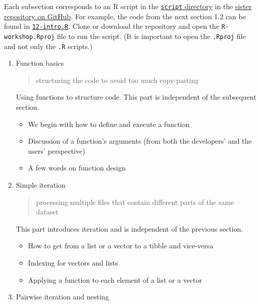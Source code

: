 \documentclass[]{book}
\providecommand{\tightlist}{%
  \setlength{\itemsep}{0pt}\setlength{\parskip}{0pt}}
\begin{document}
Each subsection corresponds to an R script in the \href{https://github.com/krlmlr/tidyprog-proj/tree/2019-05-zhr/script}{\texttt{script} directory} in the \href{https://github.com/krlmlr/tidyprog-proj/tree/2019-05-zhr}{sister repository on GitHub}.
For example, the code from the next section 1.2 can be found in \href{https://github.com/krlmlr/tidyprog-proj/tree/2019-05-zhr/script/12-intro.R}{\texttt{12-intro.R}}.
Clone or download the repository and open the \texttt{R-workshop.Rproj} file to run the script.
(It is important to open the \texttt{.Rproj} file and not only the \texttt{.R} scripts.)

\begin{enumerate}
\def\labelenumi{\arabic{enumi}.}
\item
  Function basics

  \begin{quote}
  structuring the code to avoid too much copy-pasting
  \end{quote}

  Using functions to structure code. This part is independent of the subsequent section.

  \begin{itemize}
  \tightlist
  \item
    We begin with how to define and execute a function
  \item
    Discussion of a function's arguments (from both the developers' and the users' perspective)
  \item
    A few words on function design
  \end{itemize}
\item
  Simple iteration

  \begin{quote}
  processing multiple files that contain different parts of the same dataset
  \end{quote}

  This part introduces iteration and is independent of the previous section.

  \begin{itemize}
  \tightlist
  \item
    How to get from a list or a vector to a tibble and vice-versa
  \item
    Indexing for vectors and lists
  \item
    Applying a function to each element of a list or a vector
  \end{itemize}
\item
  Pairwise iteration and nesting


\end{enumerate}
\end{document}
